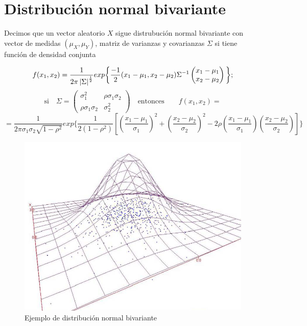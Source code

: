 \section{Distribución normal bivariante}


Decimos que un vector aleatorio $X$ sigue distrubución normal bivariante con vector de medidas $(\mu_X, \mu_Y)$, matriz de varianzas y covarianzas $\Sigma$
si tiene función de densidad conjunta

\[ f(x_1,x_2)=\frac{1}{2\pi\left| \Sigma \right|^{\frac{1}{2}}}exp\bigg{\{} \frac{-1}{2}(x_1 - \mu_1, x_2 - \mu_2)\Sigma^{-1}
\left(\begin{matrix}
    x_1 - \mu_1 \\
    x_2 - \mu_2
\end{matrix}\right) \bigg{\}}; \]
\[ \text{si}\quad \Sigma = \left( \begin{matrix}
    \sigma_1^2 & \rho\sigma_1\sigma_2 \\
    \rho\sigma_1\sigma_2 & \sigma_2^2
\end{matrix} \right) \quad \text{entonces} \qquad f(x_1,x_2)= \]
\[ = \frac{1}{2\pi\sigma_1\sigma_2\sqrt{1 - \rho^2}}exp\Biggl\{\frac{1}{2(1-\rho^2)}\left[ \left( \frac{x_1-\mu_1}{\sigma_1} \right)^2 + \left( \frac{x_2 - \mu_2}{\sigma_2} \right)^2 - 2\rho\left( \frac{x_1 - \mu_1}{\sigma_1} \right) \left( \frac{x_2 - \mu_2}{\sigma_2} \right) \right] \Biggr\} \]

\begin{figure}[htbp]
    \center
    \includegraphics[scale=0.6]{img/NormalBivariante.png}
    \caption{Ejemplo de distribución normal bivariante}
\end{figure}

